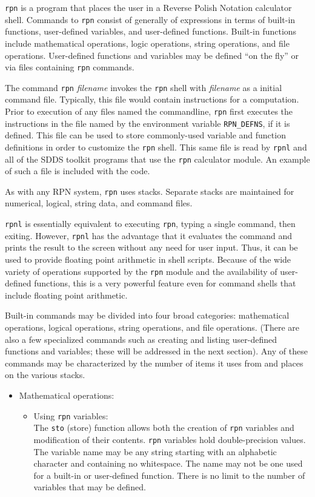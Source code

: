 \begin{itemize}
{\tt rpn} is a program that places the user in a Reverse Polish Notation calculator shell.  Commands to {\tt rpn} consist
of generally of expressions in terms of built-in functions, user-defined variables, and user-defined functions.  Built-in
functions include mathematical operations, logic operations, string operations, and file operations.  User-defined
functions and variables may be defined ``on the fly'' or via files containing {\tt rpn} commands. 

The command {\tt rpn} {\em filename} invokes the {\tt rpn} shell with {\em filename} as a initial command file.
Typically, this file would contain instructions for a computation.  Prior to execution of any files named the
commandline, {\tt rpn} first executes the instructions in the file named by the environment variable {\tt RPN\_DEFNS}, if
it is defined.  This file can be used to store commonly-used variable and function definitions in order to customize the
{\tt rpn} shell.  This same file is read by {\tt rpnl} and all of the SDDS toolkit programs that use the {\tt rpn}
calculator module.  An example of such a file is included with the code.

As with any RPN system, {\tt rpn} uses stacks. Separate stacks are maintained for numerical, logical, string data, and
command files.

{\tt rpnl} is essentially equivalent to executing {\tt rpn}, typing a single command, then exiting.  However, {\tt rpnl}
has the advantage that it evaluates the command and prints the result to the screen without any need for user input.
Thus, it can be used to provide floating point arithmetic in shell scripts.  Because of the wide variety of operations
supported by the {\tt rpn} module and the availability of user-defined functions, this is a very powerful feature even for
command shells that include floating point arithmetic.

Built-in commands may be divided into four broad categories: mathematical operations, logical operations, string
operations, and file operations.  (There are also a few specialized commands such as creating and listing user-defined
functions and variables; these will be addressed in the next section).  Any of these commands may be characterized
by the number of items it uses from and places on the various stacks.

\begin{itemize}
\item Mathematical operations:
\begin{itemize}
\item Using {\tt rpn} variables:\\
The {\tt sto} (store) function allows both the creation of {\tt rpn} variables and modification of their
contents.  {\tt rpn} variables hold double-precision values.  The variable name may be any string starting
with an alphabetic character and containing no whitespace.  The name may not be one used for a built-in
or user-defined function.   There is no limit to the number of variables that may be defined.


\end{itemize}
\end{itemize}
\end{itemize}
